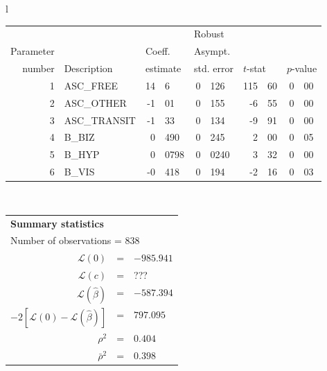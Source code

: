   \begin{tabular}{l}
\begin{tabular}{rlr@{.}lr@{.}lr@{.}lr@{.}l}
         &                       &   \multicolumn{2}{l}{}    & \multicolumn{2}{l}{Robust}  &     \multicolumn{4}{l}{}   \\
Parameter &                       &   \multicolumn{2}{l}{Coeff.}      & \multicolumn{2}{l}{Asympt.}  &     \multicolumn{4}{l}{}   \\
number &  Description                     &   \multicolumn{2}{l}{estimate}      & \multicolumn{2}{l}{std. error}  &   \multicolumn{2}{l}{$t$-stat}  &   \multicolumn{2}{l}{$p$-value}   \\

\hline

1 & ASC\_FREE & 14&6 & 0&126 & 115&60 & 0&00 \\
2 & ASC\_OTHER & -1&01 & 0&155 & -6&55 & 0&00 \\
3 & ASC\_TRANSIT & -1&33 & 0&134 & -9&91 & 0&00 \\
4 & B\_BIZ & 0&490 & 0&245 & 2&00 & 0&05 \\
5 & B\_HYP & 0&0798 & 0&0240 & 3&32 & 0&00 \\
6 & B\_VIS & -0&418 & 0&194 & -2&16 & 0&03 \\
\hline

\end{tabular}
\\
\begin{tabular}{rcl}
\multicolumn{3}{l}{\bf Summary statistics}\\
\multicolumn{3}{l}{ Number of observations = $838$} \\
 $\mathcal{L}(0)$ &=&  $-985.941$ \\
 $\mathcal{L}(c)$ &=& ???\\
 $\mathcal{L}(\hat{\beta})$ &=& $-587.394 $  \\
 $-2[\mathcal{L}(0) -\mathcal{L}(\hat{\beta})]$ &=& $797.095$ \\
    $\rho^2$ &=&   $0.404$ \\
    $\bar{\rho}^2$ &=&    $0.398$ \\
\end{tabular}
\end{tabular}

